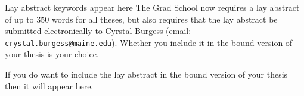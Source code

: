 \dissacceptance
{}
\libraryrights

\begin{abstract}
The abstract for you thesis will appear on this page.  It should be limited to 350 words for a Ph.D thesis or 500 words for a Master's thesis.
\end{abstract}

\begin{layabstract}{Lay abstract keywords appear here}
The Grad School now requires a lay abstract of up to 350 words for all theses, but also requires that the lay abstract be submitted electronically to Cyrstal Burgess (email: \verb=crystal.burgess@maine.edu=).  Whether you include it in the bound version of your thesis is your choice.

If you do want to include the lay abstract in the bound version of your thesis then it will appear here.
\end{layabstract}

